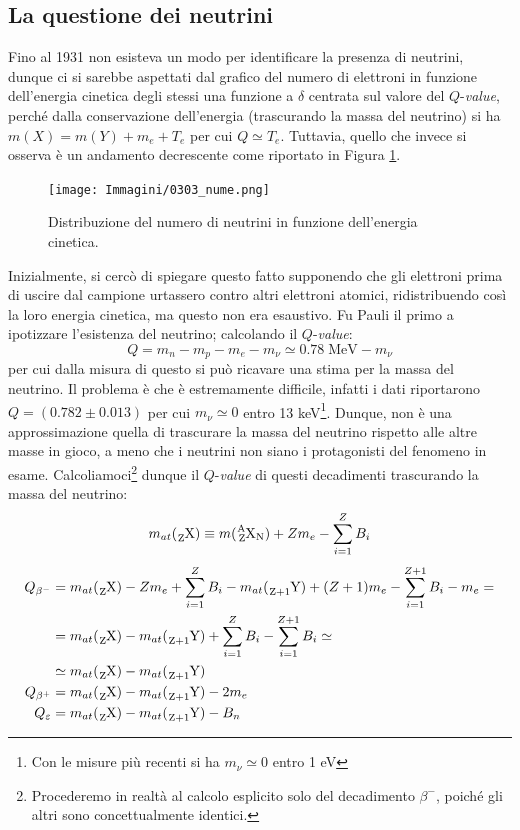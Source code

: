 \subsection{La questione dei neutrini} 
Fino al 1931 non esisteva un modo per identificare la presenza di neutrini, dunque ci si sarebbe aspettati dal grafico del numero di elettroni in funzione dell'energia cinetica degli stessi una funzione a $\delta$ centrata sul valore del $Q$-\textit{value}, perché dalla conservazione dell'energia (trascurando la massa del neutrino) si ha $m(X) = m(Y) + m_e + T_e$ per cui $Q\simeq T_e$.
Tuttavia, quello che invece si osserva è un andamento decrescente come riportato in Figura \ref{0303_ne}.
\begin{figure}[h]
    \centering
    \texttt{[image: Immagini/0303\_nume.png]}
    \caption{Distribuzione del numero di neutrini in funzione dell'energia cinetica.}
    \label{0303_ne}
\end{figure}
Inizialmente, si cercò di spiegare questo fatto supponendo che gli elettroni prima di uscire dal campione urtassero contro altri elettroni atomici, ridistribuendo così la loro energia cinetica, ma questo non era esaustivo. Fu Pauli il primo a ipotizzare l'esistenza del neutrino; calcolando il $Q$-\textit{value}:
$$Q = m_n - m_p - m_e - m_\nu \simeq 0.78 \;\mbox{MeV} - m_\nu$$
per cui dalla misura di questo si può ricavare una stima per la massa del neutrino. Il problema è che è estremamente difficile, infatti i dati riportarono $Q = (0.782 \pm 0.013)$ per cui $m_\nu \simeq 0$ entro 13 keV\footnote{Con le misure più recenti si ha $m_\nu \simeq 0$ entro 1 eV}. Dunque, non è una  approssimazione quella di trascurare la massa del neutrino rispetto alle altre masse in gioco, a meno che i neutrini non siano i protagonisti del fenomeno in esame. Calcoliamoci\footnote{Procederemo in realtà al calcolo esplicito solo del decadimento $\beta^-$, poiché gli altri sono concettualmente identici.} dunque il $Q$-\textit{value} di questi decadimenti trascurando la massa del neutrino:
$$m_{at} (\ce{_{Z}X}) \equiv m(\ce{^A_ZX_N})+Zm_e - \sum_{i=1}^Z B_i$$
\begin{displaymath}
\begin{aligned}
Q_{\beta^-} &= m_{at}(\ce{_ZX}) - Zm_e + \sum_{i=1}^Z B_i - m_{at}(\ce{_{Z+1}Y}) + (Z+1) m_e - \sum_{i=1}^{Z+1} B_i - m_e= \\
&= m_{at}(\ce{_ZX}) - m_{at}(\ce{_{Z+1}Y}) + \sum_{i=1}^Z B_i - \sum_{i=1}^{Z+1} B_i \simeq \\
&\simeq m_{at}(\ce{_ZX}) - m_{at}(\ce{_{Z+1}Y}) \\
Q_{\beta^+} &= m_{at}(\ce{_ZX}) - m_{at}(\ce{_{Z+1}Y}) - 2m_e \\
Q_{\varepsilon} &= m_{at}(\ce{_ZX}) - m_{at}(\ce{_{Z+1}Y}) - B_n
\end{aligned}
\end{displaymath}
